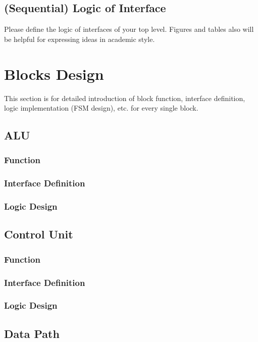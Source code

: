 \documentclass[a4paper]{article}
\begin{document}
\subsection{(Sequential) Logic of Interface}\label{sub:logicinter}
Please define the logic of interfaces of your top level. Figures and tables also will be helpful for expressing ideas in academic style.
\section{Blocks Design}
This section is for detailed introduction of block function, interface definition, logic implementation (FSM design), etc. for every single block.
\subsection{ALU}\label{sub:alu}
\subsubsection{Function}
\subsubsection{Interface Definition}
\subsubsection{Logic Design}

\subsection{Control Unit}\label{sub:ctl}
\subsubsection{Function}
\subsubsection{Interface Definition}
\subsubsection{Logic Design}

\subsection{Data Path}\label{sub:dat}
\end{document}
